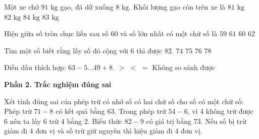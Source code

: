 \begin{ex} %
Một xe chở $91\text{ kg}$ gạo, đã dỡ xuống $8\text{ kg}$. Khối lượng gạo còn trên xe là
\choice
{$81\text{ kg}$}
{$82\text{ kg}$}
{$84\text{ kg}$}
{\True $83\text{ kg}$}
\end{ex}

\begin{ex} %
Hiệu giữa số tròn chục liền sau số $60$ và số lớn nhất có một chữ số là
\choice
{$59$}
{\True $61$}
{$60$}
{$62$}
\end{ex}

\begin{ex} %
Tìm một số biết rằng lấy số đó cộng với $6$ thì được $82$.
\choice
{$74$}
{$75$}
{\True $76$}
{$78$}
\end{ex}

\begin{ex} %
Điền dấu thích hợp: $63 - 5 \dots 49 + 8$.
\choice
{\True $>$}
{$<$}
{$=$}
{Không so sánh được}
\end{ex}

\textbf{Phần 2. Trắc nghiệm đúng sai}

\begin{ex} %
Xét tính đúng sai của phép trừ có nhớ số có hai chữ số cho số có một chữ số:
\choiceTF
{\True Phép trừ $71 - 8$ có kết quả bằng $63$.}
{Trong phép trừ $54 - 6$, vì 4 không trừ được 6 nên ta lấy 6 trừ 4 bằng 2.}
{\True Biểu thức $82 - 9$ có giá trị bằng $73$.}
{\True Nếu số bị trừ giảm đi 4 đơn vị và số trừ giữ nguyên thì hiệu giảm đi 4 đơn vị.}
\end{ex}

